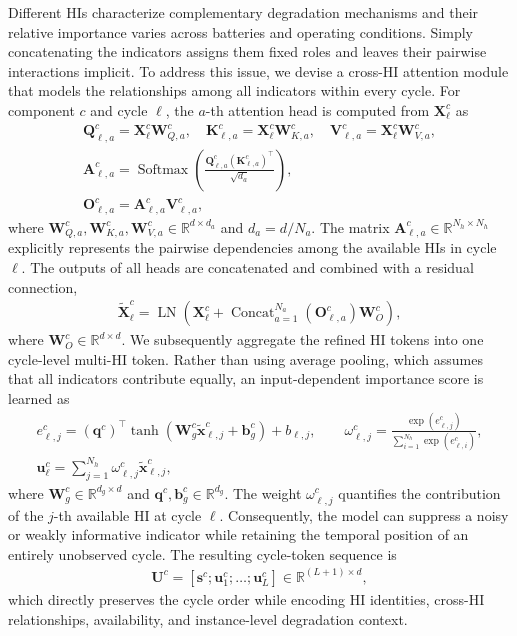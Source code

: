 \documentclass[preprint,12pt]{elsarticle}
\begin{document}
Different HIs characterize complementary degradation mechanisms and their relative importance varies across batteries and operating conditions. Simply concatenating the indicators assigns them fixed roles and leaves their pairwise interactions implicit. To address this issue, we devise a cross-HI attention module that models the relationships among all indicators within every cycle. For component $c$ and cycle $\ell$, the $a$-th attention head is computed from $\mathbf{X}_{\ell}^{c}$ as
\begin{gather}
\mathbf{Q}_{\ell,a}^{c}=\mathbf{X}_{\ell}^{c}\mathbf{W}_{Q,a}^{c},\quad
\mathbf{K}_{\ell,a}^{c}=\mathbf{X}_{\ell}^{c}\mathbf{W}_{K,a}^{c},\quad
\mathbf{V}_{\ell,a}^{c}=\mathbf{X}_{\ell}^{c}\mathbf{W}_{V,a}^{c},\\
\mathbf{A}_{\ell,a}^{c}
=\operatorname{Softmax}\left(
\frac{\mathbf{Q}_{\ell,a}^{c}(\mathbf{K}_{\ell,a}^{c})^{\top}}{\sqrt{d_a}}
\right), \\
\mathbf{O}_{\ell,a}^{c}
=\mathbf{A}_{\ell,a}^{c}\mathbf{V}_{\ell,a}^{c},
\end{gather}
where $\mathbf{W}_{Q,a}^{c},\mathbf{W}_{K,a}^{c},\mathbf{W}_{V,a}^{c}\in\mathbb{R}^{d\times d_a}$ and $d_a=d/N_a$. The matrix $\mathbf{A}_{\ell,a}^{c}\in\mathbb{R}^{N_h\times N_h}$ explicitly represents the pairwise dependencies among the available HIs in cycle $\ell$. The outputs of all heads are concatenated and combined with a residual connection,
\begin{gather}
\widetilde{\mathbf{X}}_{\ell}^{c}
=\operatorname{LN}\left(
\mathbf{X}_{\ell}^{c}
+\operatorname{Concat}_{a=1}^{N_a}(\mathbf{O}_{\ell,a}^{c})\mathbf{W}_{O}^{c}
\right),
\end{gather}
where $\mathbf{W}_{O}^{c}\in\mathbb{R}^{d\times d}$. 
We subsequently aggregate the refined HI tokens into one cycle-level multi-HI token. Rather than using average pooling, which assumes that all indicators contribute equally, an input-dependent importance score is learned as
\begin{gather}
e_{\ell,j}^{c}
=(\mathbf{q}^{c})^{\top}
\tanh(\mathbf{W}_{g}^{c}\widetilde{\mathbf{x}}_{\ell,j}^{c}
+\mathbf{b}_{g}^{c})+b_{\ell,j},\qquad
\omega_{\ell,j}^{c}
=\frac{\exp(e_{\ell,j}^{c})}
{\sum_{i=1}^{N_h}\exp(e_{\ell,i}^{c})},\\
\mathbf{u}_{\ell}^{c}
=\sum_{j=1}^{N_h}\omega_{\ell,j}^{c}
\widetilde{\mathbf{x}}_{\ell,j}^{c},
\end{gather}
where $\mathbf{W}_{g}^{c}\in\mathbb{R}^{d_g\times d}$ and $\mathbf{q}^{c},\mathbf{b}_{g}^{c}\in\mathbb{R}^{d_g}$. The weight $\omega_{\ell,j}^{c}$ quantifies the contribution of the $j$-th available HI at cycle $\ell$. Consequently, the model can suppress a noisy or weakly informative indicator while retaining the temporal position of an entirely unobserved cycle. The resulting cycle-token sequence is
\begin{gather}
\mathbf{U}^{c}
=[\mathbf{s}^{c};\mathbf{u}_{1}^{c};\ldots;\mathbf{u}_{L}^{c}]
\in\mathbb{R}^{(L+1)\times d},
\end{gather}
which directly preserves the cycle order while encoding HI identities, cross-HI relationships, availability, and instance-level degradation context.
\end{document}
